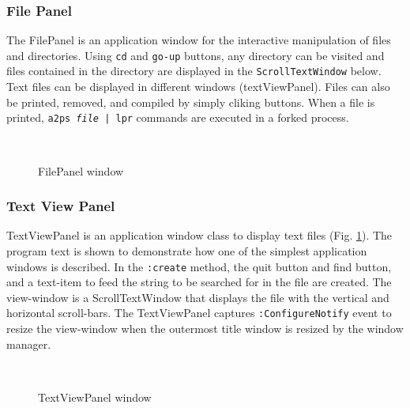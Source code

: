 \begin{refdesc}

\end{refdesc}

\subsubsection{File Panel}
The FilePanel is an application window for the interactive  manipulation
of files and directories.
Using {\tt cd} and {\tt go-up} buttons, any directory can be visited
and files contained in the directory are displayed in the {\tt ScrollTextWindow}
below.
Text files can be displayed in different windows (textViewPanel).
Files can also be printed, removed, and compiled by simply cliking buttons.
When a file is printed, {\tt a2ps {\em file} | lpr} commands are executed
in a forked process.

\begin{figure}
\begin{center}
\mbox{
\epsfysize=7.5cm
}
\end{center}
\caption{FilePanel window}
\end{figure}

\subsubsection{Text View Panel}

TextViewPanel is an application window class to display text files
(Fig. \ref{textviewpanel}).
The program text is shown to demonstrate how 
one of the simplest application windows is described.
In the {\tt :create} method, the quit button and find button,
and a text-item to feed the string to be searched for in the file
are created.
The view-window is a ScrollTextWindow that displays the file
with the vertical and horizontal scroll-bars.
The TextViewPanel captures {\tt :ConfigureNotify} event
to resize the view-window when the outermost title window is resized
by the window manager.

\begin{figure}
\begin{center}
\mbox{
\epsfysize=7cm
}
\end{center}
\caption{TextViewPanel window\label{textviewpanel}}
\end{figure}

